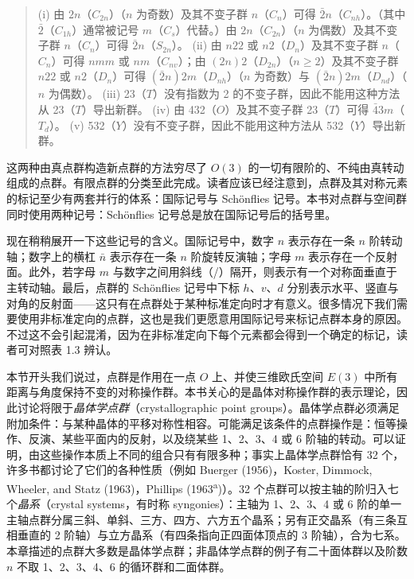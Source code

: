\begin{quote}
(i) 由 $2n$（$C_{2n}$）（$n$ 为奇数）及其不变子群 $n$（$C_{n}$）可得 $\bar{2}n$（$C_{nh}$）。（其中 $\bar{2}$（$C_{1h}$）通常被记号 $m$（$C_{s}$）代替。）由 $2n$（$C_{2n}$）（$n$ 为偶数）及其不变子群 $n$（$C_{n}$）可得 $\bar{2}n$（$S_{2n}$）。
(ii) 由 $n22$ 或 $n2$（$D_{n}$）及其不变子群 $n$（$C_{n}$）可得 $nmm$ 或 $nm$（$C_{nv}$）；由 $(2n)2$（$D_{2n}$）（$n \geqslant 2$）及其不变子群 $n22$ 或 $n2$（$D_{n}$）可得 $(\bar{2}n)2m$（$D_{nh}$）（$n$ 为奇数）与 $(\bar{2}n)2m$（$D_{nd}$）（$n$ 为偶数）。
(iii) 23（$T$）没有指数为 2 的不变子群，因此不能用这种方法从 23（$T$）导出新群。
(iv) 由 432（$O$）及其不变子群 23（$T$）可得 $\bar{4}3m$（$T_{d}$）。
(v) 532（$Y$）没有不变子群，因此不能用这种方法从 532（$Y$）导出新群。
\end{quote}

这两种由真点群构造新点群的方法穷尽了 $O(3)$ 的一切有限阶的、不纯由真转动组成的点群。有限点群的分类至此完成。读者应该已经注意到，点群及其对称元素的标记至少有两套并行的体系：国际记号与 Schönflies 记号。本书对点群与空间群同时使用两种记号：Schönflies 记号总是放在国际记号后的括号里。

现在稍稍展开一下这些记号的含义。国际记号中，数字 $n$ 表示存在一条 $n$ 阶转动轴；数字上的横杠 $\bar{n}$ 表示存在一条 $n$ 阶旋转反演轴；字母 $m$ 表示存在一个反射面。此外，若字母 $m$ 与数字之间用斜线（/）隔开，则表示有一个对称面垂直于主转动轴。最后，点群的 Schönflies 记号中下标 $h$、$v$、$d$ 分别表示水平、竖直与对角的反射面——这只有在点群处于某种标准定向时才有意义。很多情况下我们需要使用非标准定向的点群，这也是我们更愿意用国际记号来标记点群本身的原因。不过这不会引起混淆，因为在非标准定向下每个元素都会得到一个确定的标记，读者可对照表 1.3 辨认。

本节开头我们说过，点群是作用在一点 $O$ 上、并使三维欧氏空间 $E(3)$ 中所有距离与角度保持不变的对称操作群。本书关心的是晶体对称操作群的表示理论，因此讨论将限于\textit{晶体学点群}（crystallographic point groups）。晶体学点群必须满足附加条件：与某种晶体的平移对称性相容。可能满足该条件的点群操作是：恒等操作、反演、某些平面内的反射，以及绕某些 1、2、3、4 或 6 阶轴的转动。可以证明，由这些操作本质上不同的组合只有有限多种；事实上晶体学点群恰有 32 个，许多书都讨论了它们的各种性质（例如 Buerger (1956)，Koster, Dimmock, Wheeler, and Statz (1963)，Phillips (1963\textsuperscript{a})）。32 个点群可以按主轴的阶归入七个\textit{晶系}（crystal systems，有时称 syngonies）：主轴为 1、2、3、4 或 6 阶的单一主轴点群分属三斜、单斜、三方、四方、六方五个晶系；另有正交晶系（有三条互相垂直的 2 阶轴）与立方晶系（有四条指向正四面体顶点的 3 阶轴），合为七系。本章描述的点群大多数是晶体学点群；非晶体学点群的例子有二十面体群以及阶数 $n$ 不取 1、2、3、4、6 的循环群和二面体群。

